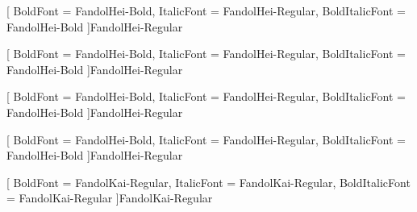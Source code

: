[
  BoldFont       = FandolHei-Bold,
  ItalicFont     = FandolHei-Regular,
  BoldItalicFont = FandolHei-Bold
]{FandolHei-Regular}

[
  BoldFont       = FandolHei-Bold,
  ItalicFont     = FandolHei-Regular,
  BoldItalicFont = FandolHei-Bold
]{FandolHei-Regular}

[
  BoldFont       = FandolHei-Bold,
  ItalicFont     = FandolHei-Regular,
  BoldItalicFont = FandolHei-Bold
]{FandolHei-Regular}

[
  BoldFont       = FandolHei-Bold,
  ItalicFont     = FandolHei-Regular,
  BoldItalicFont = FandolHei-Bold
]{FandolHei-Regular}

[
  BoldFont       = FandolKai-Regular,
  ItalicFont     = FandolKai-Regular,
  BoldItalicFont = FandolKai-Regular
]{FandolKai-Regular}

\NewCommandCopy{\AJoriginaltextit}{\textit}


\endinput
